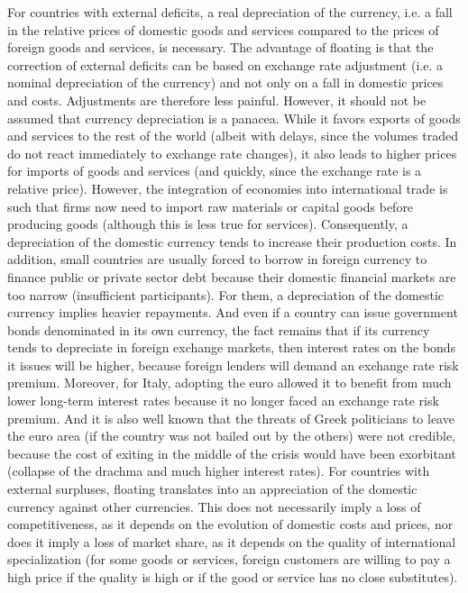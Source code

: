 \documentclass[12pt]{article}
\begin{document}
For countries with external deficits, a real depreciation of the currency, i.e. a fall in the relative prices of domestic goods and services compared to the prices of foreign goods and services, is necessary. The advantage of floating is that the correction of external deficits can be based on exchange rate adjustment (i.e. a nominal depreciation of the currency) and not only on a fall in domestic prices and costs. Adjustments are therefore less painful. However, it should not be assumed that currency depreciation is a panacea. While it favors exports of goods and services to the rest of the world (albeit with delays, since the volumes traded do not react immediately to exchange rate changes), it also leads to higher prices for imports of goods and services (and quickly, since the exchange rate is a relative price). However, the integration of economies into international trade is such that firms now need to import raw materials or capital goods before producing goods (although this is less true for services). Consequently, a depreciation of the domestic currency tends to increase their production costs. In addition, small countries are usually forced to borrow in foreign currency to finance public or private sector debt because their domestic financial markets are too narrow (insufficient participants). For them, a depreciation of the domestic currency implies heavier repayments. And even if a country can issue government bonds denominated in its own currency, the fact remains that if its currency tends to depreciate in foreign exchange markets, then interest rates on the bonds it issues will be higher, because foreign lenders will demand an exchange rate risk premium. Moreover, for Italy, adopting the euro allowed it to benefit from much lower long-term interest rates because it no longer faced an exchange rate risk premium. And it is also well known that the threats of Greek politicians to leave the euro area (if the country was not bailed out by the others) were not credible, because the cost of exiting in the middle of the crisis would have been exorbitant (collapse of the drachma and much higher interest rates). For countries with external surpluses, floating translates into an appreciation of the domestic currency against other currencies. This does not necessarily imply a loss of competitiveness, as it depends on the evolution of domestic costs and prices, nor does it imply a loss of market share, as it depends on the quality of international specialization (for some goods or services, foreign customers are willing to pay a high price if the quality is high or if the good or service has no close substitutes).
\end{document}
